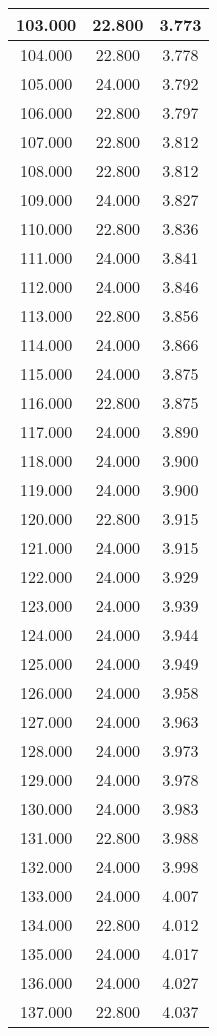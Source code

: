 \begin{longtable}[c]{|c|c|c|}
103.000	&22.800&3.773  \\ \hline 	
104.000	&22.800&3.778  \\ \hline 	
105.000	&24.000&3.792  \\ \hline 	
106.000	&22.800&3.797  \\ \hline 	
107.000	&22.800&3.812  \\ \hline 	
108.000	&22.800&3.812  \\ \hline 	
109.000	&24.000&3.827  \\ \hline 	
110.000	&22.800&3.836  \\ \hline 	
111.000	&24.000&3.841  \\ \hline 	
112.000	&24.000&3.846  \\ \hline 	
113.000	&22.800&3.856  \\ \hline 	
114.000	&24.000&3.866  \\ \hline 	
115.000	&24.000&3.875  \\ \hline 	
116.000	&22.800&3.875  \\ \hline 	
117.000	&24.000&3.890  \\ \hline 	
118.000	&24.000&3.900  \\ \hline 	
119.000	&24.000&3.900  \\ \hline 	
120.000	&22.800&3.915  \\ \hline 	
121.000	&24.000&3.915  \\ \hline 	
122.000	&24.000&3.929  \\ \hline 	
123.000	&24.000&3.939  \\ \hline 	
124.000	&24.000&3.944  \\ \hline 	
125.000	&24.000&3.949  \\ \hline 	
126.000	&24.000&3.958  \\ \hline 	
127.000	&24.000&3.963  \\ \hline 	
128.000	&24.000&3.973  \\ \hline 	
129.000	&24.000&3.978  \\ \hline 	
130.000	&24.000&3.983  \\ \hline 	
131.000	&22.800&3.988  \\ \hline 	
132.000	&24.000&3.998  \\ \hline 	
133.000	&24.000&4.007  \\ \hline 	
134.000	&22.800&4.012  \\ \hline 	
135.000	&24.000&4.017  \\ \hline 	
136.000	&24.000&4.027  \\ \hline 	
137.000	&22.800&4.037  \\ \hline 	

\end{longtable}
